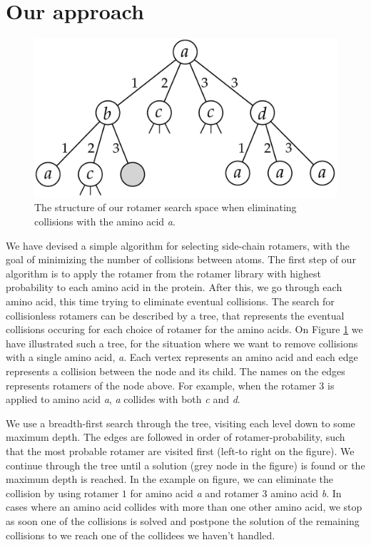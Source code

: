 \section{Our approach}
\begin{figure}
	\centering
	\includegraphics[width=.9\columnwidth]{figures/rotamersearch}
	\caption{The structure of our rotamer search space when eliminating
      collisions with the amino acid \textit{a}.}
    \label{fig:rotamer-search-tree}
\end{figure}
We have devised a simple algorithm for selecting side-chain rotamers,
with the goal of minimizing the number of collisions between
atoms. The first step of our algorithm is to apply the rotamer from the rotamer library
with highest probability to each amino acid in the protein. After
this, we go through each amino acid, this time trying to eliminate
eventual collisions. The search for collisionless rotamers can be
described by a tree, that represents the eventual collisions occuring
for each choice of rotamer for the amino acids. On Figure
\ref{fig:rotamer-search-tree} we have illustrated such a tree, for the
situation where we want to remove collisions with a single amino acid,
\textit{a}. Each vertex represents an amino acid and each edge
represents a collision between the node and its child. The names on
the edges represents rotamers of the node above. For example, when
the rotamer $3$ is applied to amino acid \textit{a}, \textit{a} collides
with both \textit{c} and \textit{d}.

We use a breadth-first search through the tree, visiting each level
down to some maximum depth. The edges are followed in order of
rotamer-probability, such that the most probable rotamer are visited
first (left-to right on the figure). We continue through the tree
until a solution (grey node in the figure) is found or the maximum
depth is reached. In the example on figure, we can eliminate the
collision by using rotamer $1$ for amino acid \textit{a} and rotamer
$3$ amino acid \textit{b}. In cases where an amino acid collides with
more than one other amino acid, we stop as soon one of the collisions
is solved and postpone the solution of the remaining collisions to we
reach one of the collidees we haven't handled.

